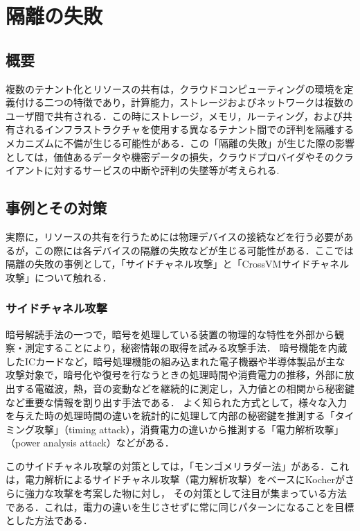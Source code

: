 \section{隔離の失敗}

\subsection{概要}
複数のテナント化とリソースの共有は，クラウドコンピューティングの環境を定義付ける二つの特徴であり，計算能力，ストレージおよびネットワークは複数のユーザ間で共有される．この時にストレージ，メモリ，ルーティング，および共有されるインフラストラクチャを使用する異なるテナント間での評判を隔離するメカニズムに不備が生じる可能性がある．この「隔離の失敗」が生じた際の影響としては，価値あるデータや機密データの損失，クラウドプロバイダやそのクライアントに対するサービスの中断や評判の失墜等が考えられる.

\subsection{事例とその対策}
実際に，リソースの共有を行うためには物理デバイスの接続などを行う必要があるが，この際には各デバイスの隔離の失敗などが生じる可能性がある．ここでは隔離の失敗の事例として，「サイドチャネル攻撃」と「CrossVMサイドチャネル攻撃」について触れる．

\subsubsection{サイドチャネル攻撃}
暗号解読手法の一つで，暗号を処理している装置の物理的な特性を外部から観察・測定することにより，秘密情報の取得を試みる攻撃手法．
暗号機能を内蔵したICカードなど，暗号処理機能の組み込まれた電子機器や半導体製品が主な攻撃対象で，暗号化や復号を行なうときの処理時間や消費電力の推移，外部に放出する電磁波，熱，音の変動などを継続的に測定し，入力値との相関から秘密鍵など重要な情報を割り出す手法である．
よく知られた方式として，様々な入力を与えた時の処理時間の違いを統計的に処理して内部の秘密鍵を推測する「タイミング攻撃」（timing attack），消費電力の違いから推測する「電力解析攻撃」（power analysis attack）などがある．\par 
このサイドチャネル攻撃の対策としては，「モンゴメリラダー法」\cite{sidechannel}がある．これは，電力解析によるサイドチャネル攻撃（電力解析攻撃）をベースにKocherがさらに強力な攻撃を考案した物\cite{kocher1999}に対し， その対策として注目が集まっている方法である．これは，電力の違いを生じさせずに常に同じパターンになることを目標とした方法である．  
	
